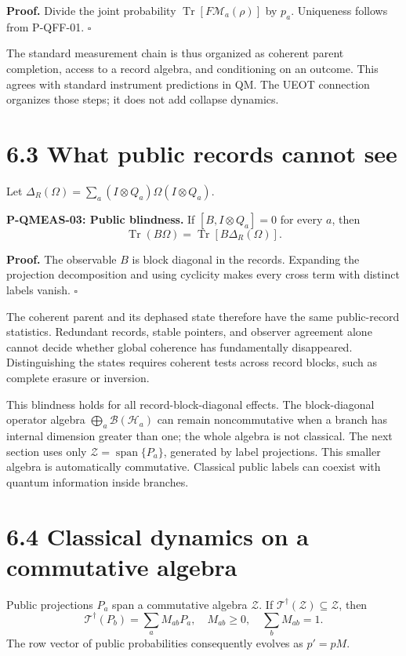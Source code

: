 \documentclass[
  11pt,
  oneside]{book}
\begin{document}
\textbf{Proof.} Divide the joint probability
\(\operatorname{Tr}[F\mathcal M_a(\rho)]\) by \(p_a\). Uniqueness
follows from P-QFF-01. \(\square\)

The standard measurement chain is thus organized as coherent parent
completion, access to a record algebra, and conditioning on an outcome.
This agrees with standard instrument predictions in QM. The UEOT
connection organizes those steps; it does not add collapse dynamics.

\section{6.3 What public records cannot see}

Let \(\Delta_R(\Omega)=\sum_a(I\otimes Q_a)\Omega(I\otimes Q_a)\).

\label{p-qmeas-03}{}

\textbf{P-QMEAS-03: Public blindness.} If \([B,I\otimes Q_a]=0\) for
every \(a\), then \[
\operatorname{Tr}(B\Omega)=\operatorname{Tr}[B\Delta_R(\Omega)].
\]

\textbf{Proof.} The observable \(B\) is block diagonal in the records.
Expanding the projection decomposition and using cyclicity makes every
cross term with distinct labels vanish. \(\square\)

The coherent parent and its dephased state therefore have the same
public-record statistics. Redundant records, stable pointers, and
observer agreement alone cannot decide whether global coherence has
fundamentally disappeared. Distinguishing the states requires coherent
tests across record blocks, such as complete erasure or inversion.

This blindness holds for all record-block-diagonal effects. The
block-diagonal operator algebra \(\bigoplus_a\mathcal B(\mathcal H_a)\)
can remain noncommutative when a branch has internal dimension greater
than one; the whole algebra is not classical. The next section uses only
\(\mathcal Z=\operatorname{span}\{P_a\}\), generated by label
projections. This smaller algebra is automatically commutative.
Classical public labels can coexist with quantum information inside
branches.

\section{6.4 Classical dynamics on a commutative algebra}

Public projections \(P_a\) span a commutative algebra \(\mathcal Z\). If
\(\mathcal T^\dagger(\mathcal Z)\subseteq\mathcal Z\), then \[
\mathcal T^\dagger(P_b)=\sum_a M_{ab}P_a,\quad
M_{ab}\ge0,\quad\sum_bM_{ab}=1.
\] The row vector of public probabilities consequently evolves as
\(p'=pM\).
\end{document}
